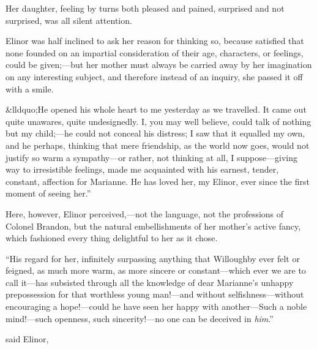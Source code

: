 
Her daughter, feeling by turns both pleased and pained, surprised and not surprised, was all silent attention.


Elinor was half inclined to ask her reason for thinking so, because satisfied that none founded on an impartial consideration of their age, characters, or feelings, could be given;---but her mother must always be carried away by her imagination on any interesting subject, and therefore instead of an inquiry, she passed it off with a smile.

&lldquo;He opened his whole heart to me yesterday as we travelled. It came out quite unawares, quite undesignedly. I, you may well believe, could talk of nothing but my child;---he could not conceal his distress; I saw that it equalled my own, and he perhaps, thinking that mere friendship, as the world now goes, would not justify so warm a sympathy---or rather, not thinking at all, I suppose---giving way to irresistible feelings, made me acquainted with his earnest, tender, constant, affection for Marianne. He has loved her, my Elinor, ever since the first moment of seeing her.”

Here, however, Elinor perceived,---not the language, not the professions of Colonel Brandon, but the natural embellishments of her mother's active fancy, which fashioned every thing delightful to her as it chose.

“His regard for her, infinitely surpassing anything that Willoughby ever felt or feigned, as much more warm, as more sincere or constant---which ever we are to call it---has subsisted through all the knowledge of dear Marianne's unhappy prepossession for that worthless young man!---and without selfishness---without encouraging a hope!---could he have seen her happy with another---Such a noble mind!---such openness, such sincerity!---no one can be deceived in {\em him}.”

 said Elinor, 

